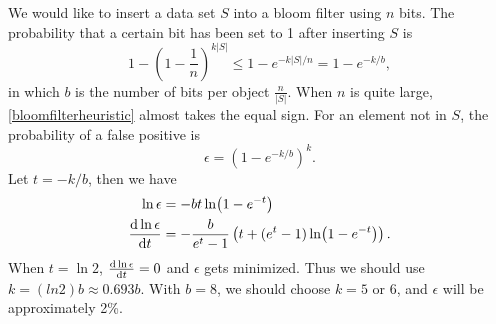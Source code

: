 We would like to insert a data set $S$ into a bloom filter using $n$ bits. The probability that a certain bit has been set to 1 after inserting $S$ is
\begin{equation}\label{bloomfilterheuristic}
1- \left(1-\frac{1}{n}\right)^{k\lvert S\rvert}\leq 1-e^{-k\lvert S\rvert/n}=1-e^{-k/b},
\end{equation}
in which $b$ is the number of bits per object $\frac{n}{\lvert S\rvert}.$ When $n$ is quite large, \eqref{bloomfilterheuristic} almost takes the equal sign. For an element not in $S$, the probability of a false positive is 
\begin{equation*}
\epsilon=\left(1-e^{-k/b}\right)^k.
\end{equation*}
Let $t=-k/b$, then we have
\begin{align*}
\ln\epsilon&=-bt\ln(1-e^{-t})\\
\dv{\ln\epsilon}{t}&=-\frac{b}{e^t-1}\left(t+(e^t-1)\ln(1-e^{-t})\right).\\
\end{align*}
When $t=\ln 2$, $\dv{\ln\epsilon}{t}=0$ and $\epsilon$ gets minimized. Thus we should use $k=(ln 2)b\approx 0.693b.$ With $b=8$, we should choose $k=5$ or 6, and $\epsilon$ will be approximately 2\%. 

\ifx\PREAMBLE\undefined

\fi